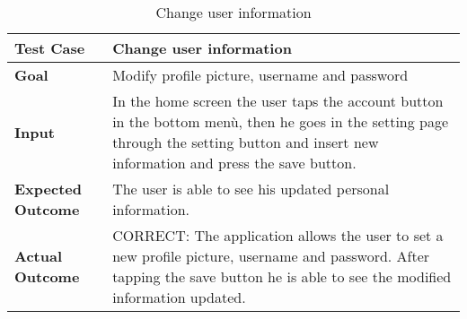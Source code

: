 \begin{table}[H]
	\centering
	\begin{tabular}{|l|l|}
	\hline
	\textbf{Test Case}& Change user information\\
	\hline
	\textbf{Goal}& Modify profile picture, username and password\\
	\hline
	\textbf{Input}& 
	\begin{minipage}{.7\linewidth}
	In the home screen the user taps the account button in the bottom menù, then he goes in the setting page through the setting button and insert new information and press the save button.
	\end{minipage}\\
	\hline
	\textbf{Expected Outcome}& The user is able to see his updated personal information.\\
	\hline
	\textbf{Actual Outcome}& 
	\begin{minipage}{.7\linewidth}
	CORRECT: The application allows the user to set a new profile picture, username and password. After tapping the save button he is able to see the modified information updated.
	\end{minipage}\\
	\hline	
	\end{tabular}
	\caption{Change user information}
\end{table}